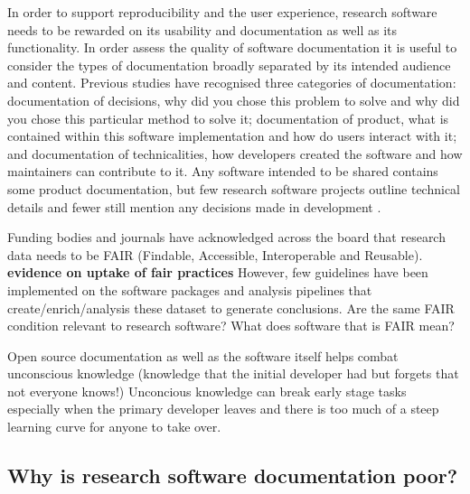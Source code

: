 \documentclass[../main.tex]{subfiles}
\begin{document}
In order to support reproducibility and the user experience, research software needs to be rewarded on its usability and documentation as well as its functionality.
In order assess the quality of software documentation it is useful to consider the types of documentation broadly separated by its intended audience and content. 
Previous studies have recognised three categories of documentation: documentation of decisions, why did you chose this problem to solve and why did you chose this particular method to solve it; documentation of product, what is contained within this software implementation and how do users interact with it; and documentation of technicalities, how developers created the software and how maintainers can contribute to it. 
Any software intended to be shared contains some product documentation, but few research software projects outline technical details and fewer still mention any decisions made in development \cite{Geiger2018}.

Funding bodies and journals have acknowledged across the board that research data needs to be FAIR (Findable, Accessible, Interoperable and Reusable). \textbf{evidence on uptake of fair practices} However, few guidelines have been implemented on the software packages and analysis pipelines that create/enrich/analysis these dataset to generate conclusions. Are the same FAIR condition relevant to research software? What does software that is FAIR mean? %


Open source documentation as well as the software itself helps combat unconscious knowledge (knowledge that the initial developer had but forgets that not everyone knows!) Unconcious knowledge can break early stage tasks especially when the primary developer leaves and there is too much of a steep learning curve for anyone to take over.  


\subsection{Why is research software documentation poor?}
\end{document}

